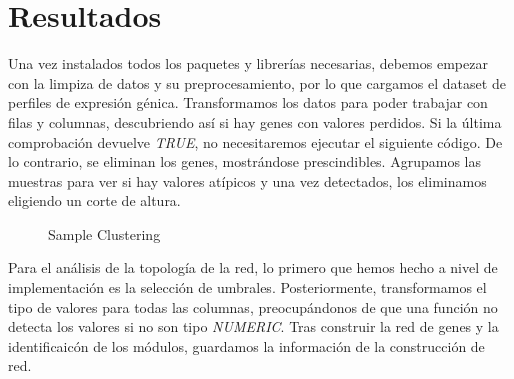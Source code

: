 
\section{Resultados}

Una vez instalados todos los paquetes y librerías necesarias, debemos empezar con la limpiza de datos y su preprocesamiento, por lo que cargamos el dataset de perfiles de expresión génica. Transformamos los datos para poder trabajar con filas y columnas, descubriendo así si hay genes con valores perdidos. Si la última comprobación devuelve \textit{TRUE}, no necesitaremos ejecutar el siguiente código. De lo contrario, se eliminan los genes, mostrándose prescindibles. Agrupamos las muestras para ver si hay valores atípicos y una vez detectados, los eliminamos eligiendo un corte de altura. 

\begin{figure}[h]
	\caption{Sample Clustering}
	\label{fig:sample_clustering}
\end{figure}

Para el análisis de la topología de la red, lo primero que hemos hecho a nivel de implementación es la selección de umbrales. Posteriormente, transformamos el tipo de valores para todas las columnas, preocupándonos de que una función no detecta los valores si no son tipo \textit{NUMERIC}. Tras construir la red de genes y la identificaicón de los módulos, guardamos la información de la construcción de red.